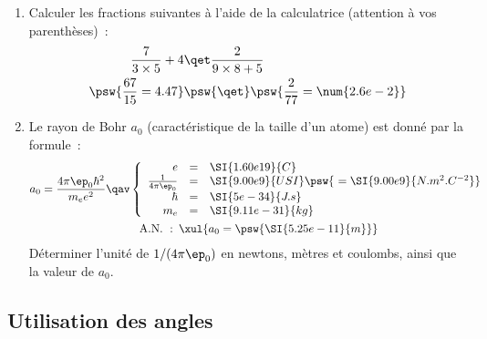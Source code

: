 \documentclass[../main/main.tex]{subfiles}
\begin{document}
\begin{enumerate}

	\item Calculer les fractions suivantes à l'aide de la calculatrice (attention
	      à vos parenthèses)~:
	      \begin{align*}
		      \frac{7}{3\times 5}+4
		       & \qet
		      \frac{2}{9\times8 + 5} \\
		      \psw{ \frac{67}{15} = 4.47 }
		       & \psw{ \qet }
		      \psw{ \frac{2}{77} = \num{2.6e-2} }
	      \end{align*}
	\item Le rayon de Bohr $a_0$ (caractéristique de la taille d'un atome) est
	      donné par la formule~:
	      \begin{gather*}
		      a_0 = \frac{4\pi \ep_0 \hbar^2}{m_ee^2}
		      \qav
		      \left\{
		      \begin{array}{rcl}
			      e                   & = & \SI{1.60e19}{C}
			      \\
			      \frac{1}{4\pi\ep_0} & = & \SI{9.00e9}{USI} \psw{~
			      = \SI{9.00e9}{N.m^{2}.C^{-2}}
			      }
			      \\
			      \hbar               & = & \SI{5e-34}{J.s}
			      \\
			      m_e                 & = & \SI{9.11e-31}{kg}
		      \end{array}
		      \right.\\
		      \mathrm{A.N.~:}\enskip
		      \xul{a_0 = \psw{\SI{5.25e-11}{m}}
		      }
	      \end{gather*}
	      Déterminer l'unité de $1/(4\pi\ep_0)$ en newtons, mètres et
	      coulombs, ainsi que la valeur de $a_0$.
	      \vspace{-20pt}
\end{enumerate}

\subsection{Utilisation des angles}
\end{document}

